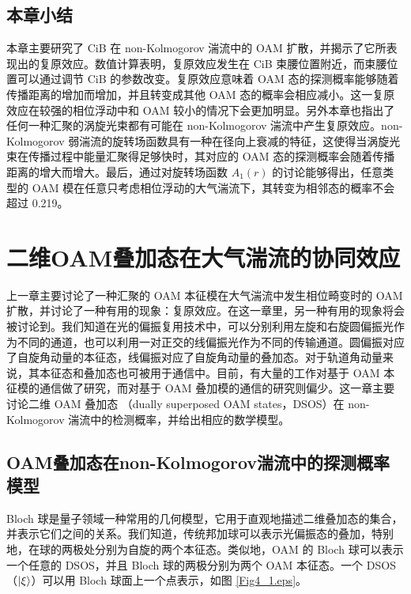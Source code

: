 \documentclass[master]{thesis-uestc}
\begin{document}
\section{本章小结}

本章主要研究了 CiB 在 non-Kolmogorov 湍流中的 OAM 扩散，并揭示了它所表现出的复原效应。数值计算表明，复原效应发生在 CiB 束腰位置附近，而束腰位置可以通过调节 CiB 的参数改变。复原效应意味着 OAM 态的探测概率能够随着传播距离的增加而增加，并且转变成其他 OAM 态的概率会相应减小。这一复原效应在较强的相位浮动中和 OAM 较小的情况下会更加明显。另外本章也指出了任何一种汇聚的涡旋光束都有可能在 non-Kolmogorov 湍流中产生复原效应。non-Kolmogorov 弱湍流的旋转场函数具有一种在径向上衰减的特征，这使得当涡旋光束在传播过程中能量汇聚得足够快时，其对应的 OAM 态的探测概率会随着传播距离的增大而增大。最后，通过对旋转场函数 $A_{1}(r)$ 的讨论能够得出，任意类型的 OAM 模在任意只考虑相位浮动的大气湍流下，其转变为相邻态的概率不会超过 0.219。


\chapter{二维OAM叠加态在大气湍流的协同效应}
上一章主要讨论了一种汇聚的 OAM 本征模在大气湍流中发生相位畸变时的 OAM 扩散，并讨论了一种有用的现象：复原效应。在这一章里，另一种有用的现象将会被讨论到。我们知道在光的偏振复用技术中，可以分别利用左旋和右旋圆偏振光作为不同的通道，也可以利用一对正交的线偏振光作为不同的传输通道。圆偏振对应了自旋角动量的本征态，线偏振对应了自旋角动量的叠加态。对于轨道角动量来说，其本征态和叠加态也可被用于通信中。目前，有大量的工作对基于 OAM 本征模的通信做了研究，而对基于 OAM 叠加模的通信的研究则偏少。这一章主要讨论二维 OAM 叠加态 （dually superposed OAM states，DSOS）在 non-Kolmogorov 湍流中的检测概率，并给出相应的数学模型。

\section{OAM叠加态在non-Kolmogorov湍流中的探测概率模型}
Bloch 球是量子领域一种常用的几何模型，它用于直观地描述二维叠加态的集合，并表示它们之间的关系。我们知道，传统邦加球可以表示光偏振态的叠加，特别地，在球的两极处分别为自旋的两个本征态。类似地，OAM 的 Bloch 球可以表示一个任意的 DSOS，并且 Bloch 球的两极分别为两个 OAM 本征态。一个 DSOS（$\ket{\xi}$）可以用 Bloch 球面上一个点表示，如图 \ref{Fig4_1.eps}。

\end{document}
